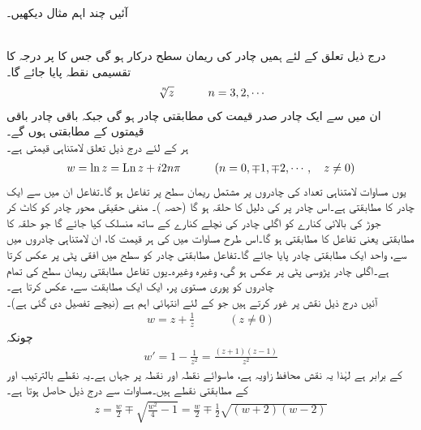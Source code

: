 آئیں چند اہم مثال دیکھیں۔

\quad {}\\
درج ذیل تعلق کے لئے ہمیں  چادر کی ریمان سطح درکار ہو گی جس کا  پر درجہ   کا تقسیمی نقطہ پایا جائے گا۔
\begin{align}
\sqrt[\leftroot{-2}\uproot{2}n]{z}\quad \quad \quad n=3,2,\cdots
\end{align}
ان میں سے ایک چادر صدر قیمت کی مطابقتی چادر ہو گی جبکہ باقی  چادر باقی  قیمتوں کے مطابقتی ہوں گے۔
\quad {}\\
ہر  کے لئے درج ذیل  تعلق لامتناہی قیمتی ہے۔
\begin{align}\label{مساوات_نقش_ریمان_سطح_لوگارتھم}
w=\ln z=\operatorname{Ln} z+i2n\pi\quad \quad \quad (n=0,\mp1,\mp2,\cdots,\quad z\ne 0)
\end{align}
یوں مساوات  لامتناہی تعداد کی چادروں پر مشتمل ریمان سطح پر تفاعل ہو گا۔تفاعل  ان میں سے ایک چادر  کا مطابقتی ہے۔اس چادر پر  کی دلیل  کا حلقہ  ہو گا (حصہ )۔ منفی حقیقی محور چادر کو کاٹ کر جوڑ کی بالائی کنارے کو  اگلی چادر کی نچلے کنارے کے ساتھ منسلک کیا جائے گا جو حلقہ  کا مطابقتی یعنی تفاعل  کا مطابقتی ہو گا۔اس طرح  مساوات  میں  کی ہر قیمت کا، ان لامتناہی چادروں میں سے،  واحد ایک مطابقتی چادر پایا جائے گا۔تفاعل  مطابقتی چادر کو  سطح میں  افقی پٹی  پر عکس کرتا ہے۔اگلی چادر پڑوسی پٹی  پر عکس ہو گی، وغیرہ وغیرہ۔یوں تفاعل  مطابقتی ریمان سطح کی تمام چادروں کو  پوری  مستوی پر، ایک ایک مطابقت سے، عکس کرتا ہے۔
\quad {}\\
آئیں درج ذیل نقش پر غور کرتے ہیں جو  کے لئے انتہائی اہم ہے (نیچے تفصیل دی گئی ہے)۔
\begin{align}\label{مساوات_نقش_ہوائی_حرکیات_الف}
w=z+\frac{1}{z}\quad \quad \quad (z\ne 0)
\end{align}
چونکہ 
\begin{align*}
w'=1-\frac{1}{z^2}=\frac{(z+1)(z-1)}{z^2}
\end{align*}
کے برابر ہے لہٰذا یہ نقش محافظ زاویہ ہے، ماسوائے  نقطہ  اور نقطہ   پر جہاں  ہے۔یہ نقطے بالترتیب  اور  کے مطابقتی نقطے ہیں۔مساوات  سے درج ذیل حاصل ہوتا ہے۔
\begin{align}
z=\frac{w}{2}\mp \sqrt{\frac{w^2}{4}-1}=\frac{w}{2}\mp\frac{1}{2}\sqrt{(w+2)(w-2)}
\end{align}
